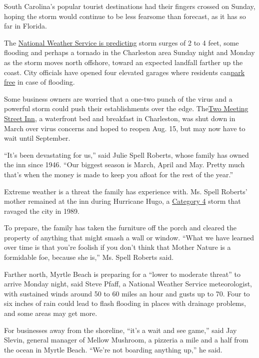 South Carolina's popular tourist destinations had their fingers crossed
on Sunday, hoping the storm would continue to be less fearsome than
forecast, as it has so far in Florida.

The \href{https://www.facebook.com/NWSCharlestonSC}{National Weather
Service is predicting} storm surges of 2 to 4 feet, some flooding and
perhaps a tornado in the Charleston area Sunday night and Monday as the
storm moves north offshore, toward an expected landfall farther up the
coast. City officials have opened four elevated garages where residents
can\href{https://charleston-sc.maps.arcgis.com/apps/MapSeries/index.html?appid=61d5ee562990480f922de9695872cd19}{park
free} in case of flooding.

Some business owners are worried that a one-two punch of the virus and a
powerful storm could push their establishments over the edge.
The\href{https://www.twomeetingstreetinn.com/}{Two Meeting Street Inn},
a waterfront bed and breakfast in Charleston, was shut down in March
over virus concerns and hoped to reopen Aug. 15, but may now have to
wait until September.

``It's been devastating for us,'' said Julie Spell Roberts, whose family
has owned the inn since 1946. ``Our biggest season is March, April and
May. Pretty much that's when the money is made to keep you afloat for
the rest of the year.''

Extreme weather is a threat the family has experience with. Ms. Spell
Roberts' mother remained at the inn during Hurricane Hugo, a
\href{https://www.weather.gov/chs/Hugo-30thAnniversary}{Category 4}
storm that ravaged the city in 1989.

To prepare, the family has taken the furniture off the porch and cleared
the property of anything that might smash a wall or window. ``What we
have learned over time is that you're foolish if you don't think that
Mother Nature is a formidable foe, because she is,'' Ms. Spell Roberts
said.

Farther north, Myrtle Beach is preparing for a ``lower to moderate
threat'' to arrive Monday night, said Steve Pfaff, a National Weather
Service meteorologist, with sustained winds around 50 to 60 miles an
hour and gusts up to 70. Four to six inches of rain could lead to flash
flooding in places with drainage problems, and some areas may get more.

For businesses away from the shoreline, ``it's a wait and see game,''
said Jay Slevin, general manager of Mellow Mushroom, a pizzeria a mile
and a half from the ocean in Myrtle Beach. ``We're not boarding anything
up,'' he said.

